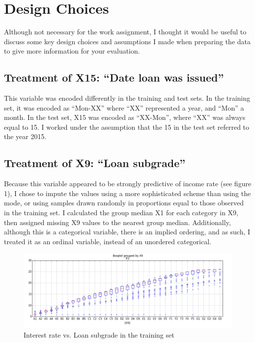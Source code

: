 \documentclass[12pt]{article}
\begin{document}


\section{Design Choices} %
\label{sec:design_choices}

Although not necessary for the work assignment, I thought it would be useful to discuss some key design choices and assumptions I made when preparing the data to give more information for your evaluation.

\subsection{Treatment of X15: ``Date loan was issued''} %
\label{sub:treatment_of_x15_}
This variable was encoded differently in the training and test sets. In the training set, it was encoded as ``Mon-XX'' where ``XX'' represented a year, and ``Mon'' a month. In the test set, X15 was encoded as ``XX-Mon'', where ``XX'' was always equal to 15. I worked under the assumption that the 15 in the test set referred to the year 2015.

\subsection{Treatment of X9: ``Loan subgrade''} %
\label{sub:treatment_of_x9_}
Because this variable appeared to be strongly predictive of income rate (see figure 1), I chose to impute the values using a more sophisticated scheme than using the mode, or using samples drawn randomly in proportions equal to those observed in the training set. 
I calculated the group median X1 for each category in X9, then assigned missing X9 values to the nearest group median.
Additionally, although this is a categorical variable, there is an implied ordering, and as such, I treated it as an ordinal variable, instead of an unordered categorical.

\begin{figure}
  \centering
  \includegraphics[scale=0.5]{X1_X9.png}
  \caption{Interest rate vs. Loan subgrade in the training set}
  \label{fig:figure1}
\end{figure}
\end{document}
